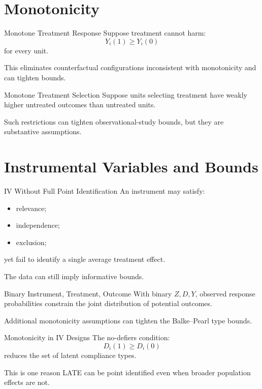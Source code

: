 \documentclass[aspectratio=169,11pt]{beamer}
\begin{document}
\section{Monotonicity}

\begin{frame}{Monotone Treatment Response}
Suppose treatment cannot harm:
\[
Y_i(1)\geq Y_i(0)
\]
for every unit.

This eliminates counterfactual configurations inconsistent with monotonicity and can tighten bounds.
\end{frame}

\begin{frame}{Monotone Treatment Selection}
Suppose units selecting treatment have weakly higher untreated outcomes than untreated units.

Such restrictions can tighten observational-study bounds, but they are substantive assumptions.
\end{frame}

\section{Instrumental Variables and Bounds}

\begin{frame}{IV Without Full Point Identification}
An instrument may satisfy:
\begin{itemize}
\item relevance;
\item independence;
\item exclusion;
\end{itemize}
yet fail to identify a single average treatment effect.

The data can still imply informative bounds.
\end{frame}

\begin{frame}{Binary Instrument, Treatment, Outcome}
With binary \(Z,D,Y\), observed response probabilities constrain the joint distribution of potential outcomes.

Additional monotonicity assumptions can tighten the Balke--Pearl type bounds.
\end{frame}

\begin{frame}{Monotonicity in IV Designs}
The no-defiers condition:
\[
D_i(1)\geq D_i(0)
\]
reduces the set of latent compliance types.

This is one reason LATE can be point identified even when broader population effects are not.
\end{frame}
\end{document}
